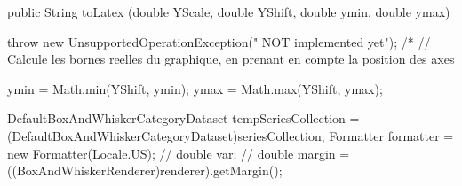 \begin{code}

   public String toLatex (double YScale, double YShift, 
                          double ymin, double ymax) \begin{hide} {
      throw new UnsupportedOperationException(" NOT implemented yet");
/*         
      // Calcule les bornes reelles du graphique, en prenant en compte la position des axes
      
      ymin = Math.min(YShift, ymin);
      ymax = Math.max(YShift, ymax);

      DefaultBoxAndWhiskerCategoryDataset tempSeriesCollection = (DefaultBoxAndWhiskerCategoryDataset)seriesCollection;
      Formatter formatter = new Formatter(Locale.US);
//       double var;
//       double margin = ((BoxAndWhiskerRenderer)renderer).getMargin();

}
\end{hide}
\end{code}
